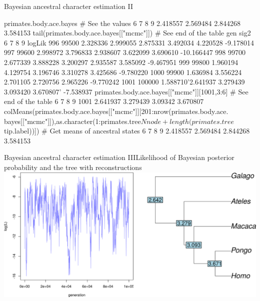 \documentclass[compress, ucs, xelatex, 11pt, xcolor=svgnames,
  hyperref={
    bookmarks=true,
    unicode=true,
    colorlinks=true,
    pdftitle={Molecular data in R},
    plainpages=false,
    pdfauthor={Vojtech Zeisek},
    pdfsubject={Course about phylogeny and evolution in R},
    pdfcreator={XeLaTeX},
    pdfkeywords={R, evolution, phylogeny, molecular data},
    linkcolor=Tomato,
    anchorcolor=SaddleBrown,
    citecolor=Goldenrod,
    filecolor=DarkMagenta,
    menucolor=Sienna,
    urlcolor=DarkTurquoise,
    pdftex},
  url={hyphens, lowtilde} %
  ]{beamer}
\begin{document}
\begin{frame}[fragile]{Bayesian ancestral character estimation II}
  \begin{spluscode}
    primates.body.ace.bayes # See the values
           6        7        8        9
    2.418557 2.569484 2.844268 3.584153
    tail(primates.body.ace.bayes[["mcmc"]]) # See end of the table
            gen     sig2        6        7        8        9     logLik
    996   99500 2.328336 2.999055 2.875331 3.492034 4.220528  -9.178014
    997   99600 2.998972 3.796833 2.938607 3.622099 3.690610 -10.166447
    998   99700 2.677339 3.888228 3.200297 2.935587 3.585092  -9.467951
    999   99800 1.960194 4.129754 3.196746 3.310278 3.425686  -9.780220
    1000  99900 1.636984 3.556224 2.701105 2.720756 2.965226  -9.770242
    1001 100000 1.588710'2.641937 3.279439 3.093420 3.670807' -7.538937
    primates.body.ace.bayes[["mcmc"]][1001,3:6] # See end of the table
                6        7       8        9
    1001 2.641937 3.279439 3.09342 3.670807
    colMeans(primates.body.ace.bayes[["mcmc"]][201:nrow(primates.body.ace.
      bayes[["mcmc"]]),as.character(1:primates.tree$Nnode+length
      (primates.tree$tip.label))]) # Get means of ancestral states
           6        7        8        9
    2.418557 2.569484 2.844268 3.584153
  \end{spluscode}
\end{frame}

\begin{frame}{Bayesian ancestral character estimation III}{Likelihood of Bayesian posterior probability and the tree with reconstructions}
  \includegraphics[width=\textwidth]{ancbayes.png}
\end{frame}
\end{document}
